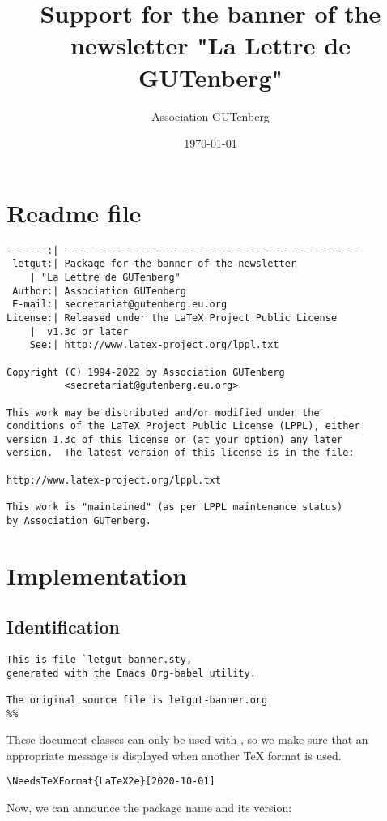 \documentclass{letgut}
\author{Association GUTenberg}
\date{\today}
\title{Support for the banner of the newsletter "La Lettre de GUTenberg"}
\begin{document}
\section{Readme file}
\label{sec:org4c9ba67}

\begin{verbatim}
-------:| ---------------------------------------------------
 letgut:| Package for the banner of the newsletter
	| "La Lettre de GUTenberg"
 Author:| Association GUTenberg
 E-mail:| secretariat@gutenberg.eu.org
License:| Released under the LaTeX Project Public License
	|  v1.3c or later
    See:| http://www.latex-project.org/lppl.txt

Copyright (C) 1994-2022 by Association GUTenberg
		  <secretariat@gutenberg.eu.org>

This work may be distributed and/or modified under the
conditions of the LaTeX Project Public License (LPPL), either
version 1.3c of this license or (at your option) any later
version.  The latest version of this license is in the file:

http://www.latex-project.org/lppl.txt

This work is "maintained" (as per LPPL maintenance status)
by Association GUTenberg.
\end{verbatim}

\section{Implementation}
\label{sec:org4c5e60d}

\subsection{Identification}
\label{sec:org09b0cd2}

\begin{verbatim}
This is file `letgut-banner.sty,
generated with the Emacs Org-babel utility.

The original source file is letgut-banner.org
%% 
\end{verbatim}

These document classes can only be used with \LaTeXe, so we make
sure that an appropriate message is displayed when another \TeX{}
format is used.

\begin{lstlisting}
\NeedsTeXFormat{LaTeX2e}[2020-10-01]
\end{lstlisting}

Now, we can announce the package name and its version:
\end{document}

